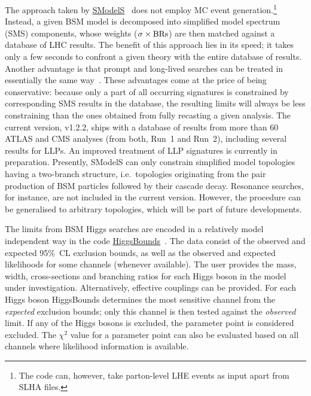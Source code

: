 \documentclass[a4paper,aps,prd,longbibliography,notitlepage,showpacs,amsmath,amssymb,superscriptaddress,nofootinbib,floatfix,11pt,preprintnumbers]{revtex4-1-mod}
\newcommand{\smodels}{\textsf{SModelS}\xspace}
\newcommand{\higgsbounds}{\textsf{HiggsBounds}\xspace}
\newcommand{\ie}{i.e.\xspace}
\begin{document}
The approach taken by \href{https://smodels.github.io/}{\smodels}~\cite{Kraml:2013mwa,Ambrogi:2017neo,Ambrogi:2018ujg} does not employ MC event generation.\footnote{The code can, however, take parton-level \textsf{LHE} events as input apart from \textsf{SLHA} files.}
Instead, a given BSM model is decomposed into simplified model spectrum (SMS) components, whose weights ($\sigma\times {\rm BRs}$) are then matched against a database of LHC results. The benefit of this approach lies in its speed; it takes only a few seconds to confront
a given theory with the entire database of results.
Another advantage is that prompt and long-lived searches can be treated in essentially the same way~\cite{Ambrogi:2018ujg}.
These advantages come at the price of being conservative: because only a part of
all occurring signatures is constrained by corresponding SMS results in the database,
the resulting limits will always be less constraining than the ones obtained from fully recasting a given analysis.
The current version, v1.2.2, ships with a database of results from more than 60 ATLAS and CMS analyses (from both, Run~1 and Run~2), including several results for LLPs. An improved treatment of LLP signatures is currently in preparation.
Presently, \smodels can only constrain simplified model topologies having a two-branch structure, \ie~topologies originating from the pair production of BSM particles followed by their cascade decay. Resonance searches, for instance, are not included in the current version. However, the procedure can be generalised to arbitrary topologies, which will be part of future developments.

The limits from BSM Higgs searches are encoded in a relatively model
independent way in the code \href{https://higgsbounds.hepforge.org/}{\higgsbounds}~\cite{Bechtle:2008jh,Bechtle:2013wla}. The data consist of the observed and expected 95\%~CL exclusion bounds, as well as the observed and expected likelihoods for some channels (whenever available).
The user provides the mass, width, cross-sections and branching ratios for each Higgs boson in the model under investigation. Alternatively, effective couplings can be provided.
For each Higgs boson \higgsbounds determines the most sensitive channel from the {\it expected} exclusion bounds;
only this channel is then tested against the {\it observed} limit. If any of the Higgs bosons is excluded, the parameter point is considered excluded.
The $\chi^2$ value for a parameter point can also be evaluated based on all channels where likelihood information is available.
\end{document}
